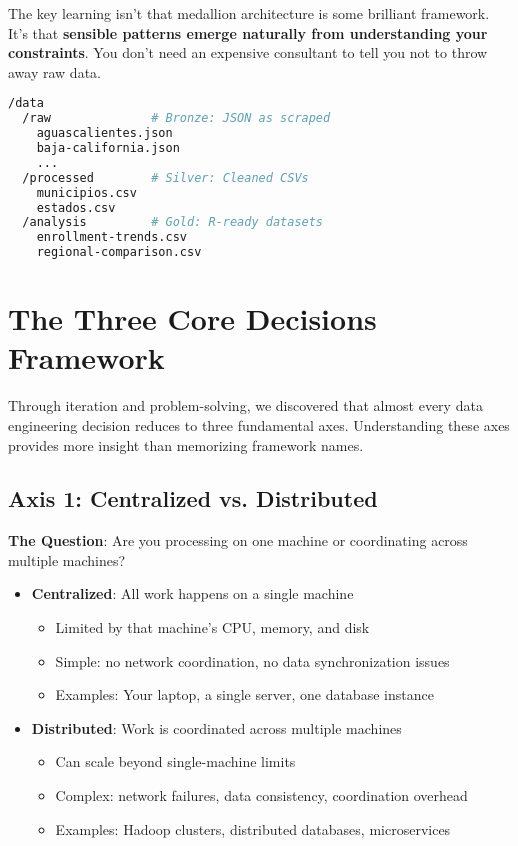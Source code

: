 \documentclass[11pt,a4paper]{article}
\begin{document}
The key learning isn't that medallion architecture is some brilliant framework. It's that \textbf{sensible patterns emerge naturally from understanding your constraints}. You don't need an expensive consultant to tell you not to throw away raw data.

\begin{lstlisting}[language=bash,caption={Our emergent directory structure}]
/data
  /raw              # Bronze: JSON as scraped
    aguascalientes.json
    baja-california.json
    ...
  /processed        # Silver: Cleaned CSVs
    municipios.csv
    estados.csv
  /analysis         # Gold: R-ready datasets
    enrollment-trends.csv
    regional-comparison.csv
\end{lstlisting}

\section{The Three Core Decisions Framework}

Through iteration and problem-solving, we discovered that almost every data engineering decision reduces to three fundamental axes. Understanding these axes provides more insight than memorizing framework names.

\subsection{Axis 1: Centralized vs. Distributed}

\textbf{The Question}: Are you processing on one machine or coordinating across multiple machines?

\begin{itemize}
    \item \textbf{Centralized}: All work happens on a single machine
    \begin{itemize}
        \item Limited by that machine's CPU, memory, and disk
        \item Simple: no network coordination, no data synchronization issues
        \item Examples: Your laptop, a single server, one database instance
    \end{itemize}

    \item \textbf{Distributed}: Work is coordinated across multiple machines
    \begin{itemize}
        \item Can scale beyond single-machine limits
        \item Complex: network failures, data consistency, coordination overhead
        \item Examples: Hadoop clusters, distributed databases, microservices
    \end{itemize}
\end{itemize}
\end{document}
